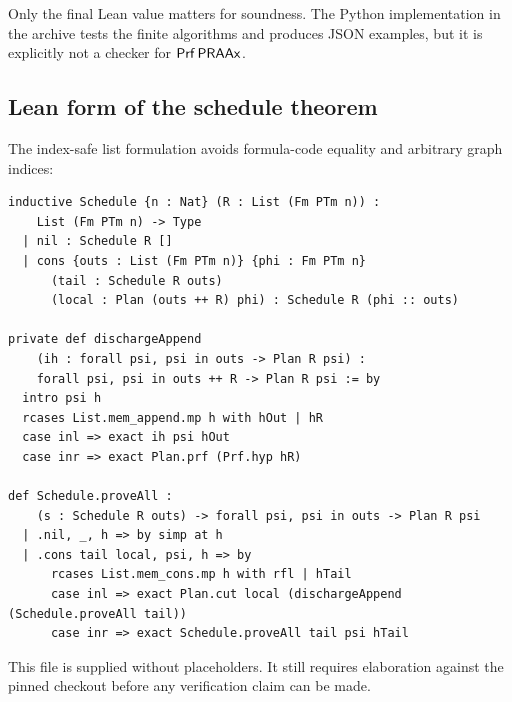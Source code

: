 Only the final Lean value matters for soundness.  The Python implementation in the archive tests the
finite algorithms and produces JSON examples, but it is explicitly not a checker for
\(\mathsf{Prf}\,\mathsf{PRAAx}\).

\subsection{Lean form of the schedule theorem}

The index-safe list formulation avoids formula-code equality and arbitrary graph indices:

\begin{lstlisting}[language=Lean]
inductive Schedule {n : Nat} (R : List (Fm PTm n)) :
    List (Fm PTm n) -> Type
  | nil : Schedule R []
  | cons {outs : List (Fm PTm n)} {phi : Fm PTm n}
      (tail : Schedule R outs)
      (local : Plan (outs ++ R) phi) : Schedule R (phi :: outs)

private def dischargeAppend
    (ih : forall psi, psi in outs -> Plan R psi) :
    forall psi, psi in outs ++ R -> Plan R psi := by
  intro psi h
  rcases List.mem_append.mp h with hOut | hR
  case inl => exact ih psi hOut
  case inr => exact Plan.prf (Prf.hyp hR)

def Schedule.proveAll :
    (s : Schedule R outs) -> forall psi, psi in outs -> Plan R psi
  | .nil, _, h => by simp at h
  | .cons tail local, psi, h => by
      rcases List.mem_cons.mp h with rfl | hTail
      case inl => exact Plan.cut local (dischargeAppend (Schedule.proveAll tail))
      case inr => exact Schedule.proveAll tail psi hTail
\end{lstlisting}

This file is supplied without placeholders.  It still requires elaboration against the pinned
checkout before any verification claim can be made.
